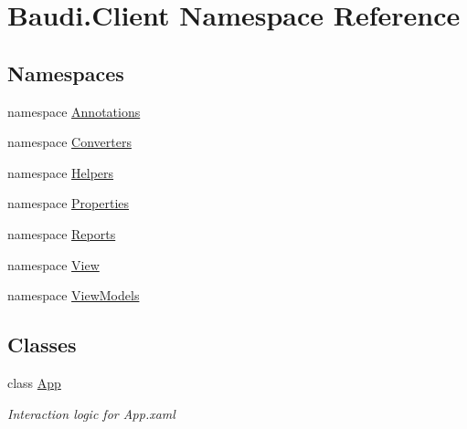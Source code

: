 \hypertarget{namespace_baudi_1_1_client}{}\section{Baudi.\+Client Namespace Reference}
\label{namespace_baudi_1_1_client}
\subsection*{Namespaces}
\begin{DoxyCompactItemize}
\item 
namespace \hyperlink{namespace_baudi_1_1_client_1_1_annotations}{Annotations}
\item 
namespace \hyperlink{namespace_baudi_1_1_client_1_1_converters}{Converters}
\item 
namespace \hyperlink{namespace_baudi_1_1_client_1_1_helpers}{Helpers}
\item 
namespace \hyperlink{namespace_baudi_1_1_client_1_1_properties}{Properties}
\item 
namespace \hyperlink{namespace_baudi_1_1_client_1_1_reports}{Reports}
\item 
namespace \hyperlink{namespace_baudi_1_1_client_1_1_view}{View}
\item 
namespace \hyperlink{namespace_baudi_1_1_client_1_1_view_models}{View\+Models}
\end{DoxyCompactItemize}
\subsection*{Classes}
\begin{DoxyCompactItemize}
\item 
class \hyperlink{class_baudi_1_1_client_1_1_app}{App}
\begin{DoxyCompactList}\small\item\em Interaction logic for App.\+xaml \end{DoxyCompactList}\end{DoxyCompactItemize}
